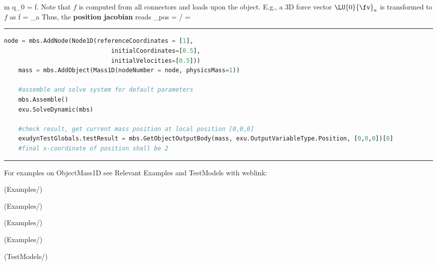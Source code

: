    \be 
      m \cdot \ddot q_0 = f.
    \ee
    Note that $f$ is computed from all connectors and loads upon the object. E.g., a 3D force vector $\LU{0}{\fv}_a$ is 
    transformed to $f$ as
    \be
      f =   _a
    \ee
    Thus, the {\bf position jacobian} reads 
    \be
      \Jm_{pos} = \partial \pv\cCur / \cCur = 
        
    \ee
\vspace{6pt}\par\noindent\rule{\textwidth}{0.4pt}
\label{miniExample_ObjectMass1D}
\pythonstyle
\begin{lstlisting}[language=Python, firstnumber=1]
    node = mbs.AddNode(Node1D(referenceCoordinates = [1], 
                              initialCoordinates=[0.5],
                              initialVelocities=[0.5]))
    mass = mbs.AddObject(Mass1D(nodeNumber = node, physicsMass=1))

    #assemble and solve system for default parameters
    mbs.Assemble()
    exu.SolveDynamic(mbs)

    #check result, get current mass position at local position [0,0,0]
    exudynTestGlobals.testResult = mbs.GetObjectOutputBody(mass, exu.OutputVariableType.Position, [0,0,0])[0]
    #final x-coordinate of position shall be 2

\end{lstlisting}

\vspace{6pt}\par\noindent\rule{\textwidth}{0.4pt}
%
\noindent For examples on ObjectMass1D see Relevant Examples and TestModels with weblink:
\bi
\item {} (Examples/)
\item {} (Examples/)
\item {} (Examples/)
\item {} (Examples/)
\item {} (TestModels/)

